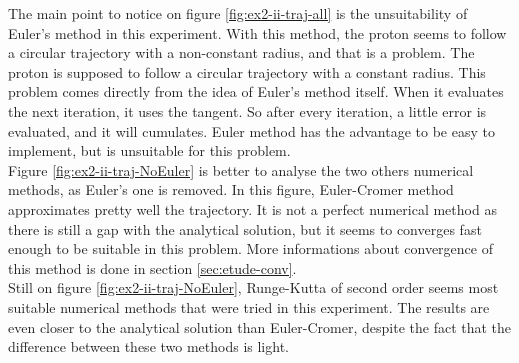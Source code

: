 \documentclass[a4paper,12pt,twoside]{article}
\begin{document}
The main point to notice on figure \ref{fig:ex2-ii-traj-all} is the unsuitability of Euler's method in this experiment.
With this method, the proton seems to follow a circular trajectory with a non-constant radius, and that is a problem.
The proton is supposed to follow a circular trajectory with a constant radius.
This problem comes directly from the idea of Euler's method itself.
When it evaluates the next iteration, it uses  the tangent. %
So after every iteration, a little error is evaluated, and it will cumulates.
Euler method has the advantage to be easy to implement, but is unsuitable for this problem.\\

Figure \ref{fig:ex2-ii-traj-NoEuler} is better to analyse the two others numerical methods, as Euler's one is removed.
In this figure, Euler-Cromer method approximates pretty well the trajectory.
It is not a perfect numerical method as there is still a gap with the analytical solution, but it seems to converges fast enough to be suitable in this problem.
More informations about convergence of this method is done in section \ref{sec:etude-conv}. \\

Still on figure \ref{fig:ex2-ii-traj-NoEuler}, Runge-Kutta of second order seems most suitable numerical methods that were tried in this experiment.
The results are even closer to the analytical solution than Euler-Cromer, despite the fact that the difference between these two methods is light.\\

\end{document}
